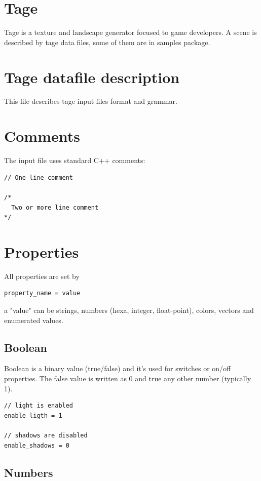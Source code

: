 \documentclass[9pt]{article}
\begin{document}
\section{Tage}

Tage is a texture and landscape generator focused to game developers. 
A scene is described by tage data files, some of them are 
in samples package.

\section{Tage datafile description}

This file describes tage input files format and grammar.

\section{Comments}

The input file uses standard C++ comments:
\begin{verbatim}
// One line comment

/*
  Two or more line comment
*/
\end{verbatim}

\section{Properties}

All properties are set by
\begin{verbatim}
property_name = value
\end{verbatim}
a "value" can be strings, numbers (hexa, integer, float-point), colors, vectors
and enumerated values.

\subsection{Boolean}

Boolean is a binary value (true/false) and it's used for switches
or on/off properties. The false value is written as 0 and true any other
number (typically 1).
\begin{verbatim}
// light is enabled 
enable_ligth = 1

// shadows are disabled
enable_shadows = 0
\end{verbatim}

\subsection{Numbers}
\end{document}
